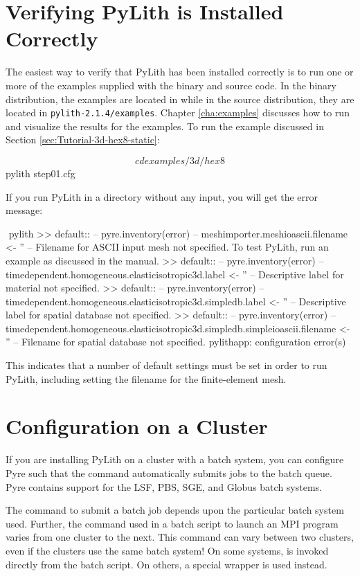 \section{Verifying PyLith is Installed Correctly}

The easiest way to verify that PyLith has been installed correctly is
to run one or more of the examples supplied with the binary and source
code. In the binary distribution, the examples are located in
 while in the source distribution,
they are located in \texttt{pylith-2.1.4/examples}. Chapter
\vref{cha:examples} discusses how to run and visualize the results
for the examples. To run the example discussed in Section
\vref{sec:Tutorial-3d-hex8-static}:
\begin{shell}
$$ cd examples/3d/hex8
$$ pylith step01.cfg
\end{shell}
If you run PyLith in a directory without any input, you will get the
error message:
\begin{shell}
$$ pylith
 >> {default}::
 -- pyre.inventory(error)
 -- meshimporter.meshioascii.filename <- ''
 -- Filename for ASCII input mesh not specified.
    To test PyLith, run an example as discussed in the manual.
 >> {default}::
 -- pyre.inventory(error)
 -- timedependent.homogeneous.elasticisotropic3d.label <- ''
 -- Descriptive label for material not specified.
 >> {default}::
 -- pyre.inventory(error)
 -- timedependent.homogeneous.elasticisotropic3d.simpledb.label <- ''
 -- Descriptive label for spatial database not specified.
 >> {default}::
 -- pyre.inventory(error)
 -- timedependent.homogeneous.elasticisotropic3d.simpledb.simpleioascii.filename <- ''
 -- Filename for spatial database not specified.
pylithapp: configuration error(s)
\end{shell}
This indicates that a number of default settings must be set in order
to run PyLith, including setting the filename for the finite-element
mesh.


\section{Configuration on a Cluster}

If you are installing PyLith on a cluster with a batch system, you can
configure Pyre such that the  command automatically
submits jobs to the batch queue. Pyre contains support for the LSF,
PBS, SGE, and Globus batch systems.

The command to submit a batch job depends upon the particular batch
system used. Further, the command used in a batch script to launch an
MPI program varies from one cluster to the next. This command can vary
between two clusters, even if the clusters use the same batch system!
On some systems,  is invoked directly from the batch
script. On others, a special wrapper is used instead.


